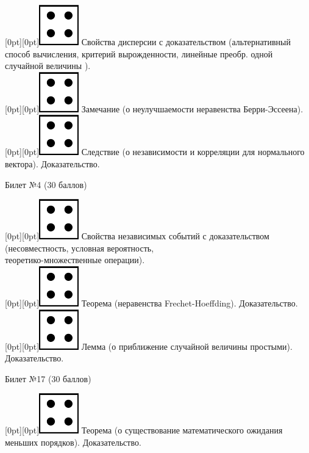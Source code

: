 \documentclass[10pt]{article}
\begin{document}
\raisebox{-1pt}[0pt][0pt]{\includegraphics[width=0.02\linewidth]{4.png}} Свойства дисперсии с доказательством (альтернативный способ вычисления, критерий вырожденности, линейные преобр. одной случайной величины ). \\ 

\raisebox{-1pt}[0pt][0pt]{\includegraphics[width=0.02\linewidth]{4.png}} Замечание (о неулучшаемости неравенства Берри-Эссеена). \\

\raisebox{-1pt}[0pt][0pt]{\includegraphics[width=0.02\linewidth]{4.png}} Следствие (о независимости и корреляции для нормального вектора). Доказательство. \\

\begin{center} {\Large Билет №4 (30 баллов)} \end{center}

\raisebox{-1pt}[0pt][0pt]{\includegraphics[width=0.02\linewidth]{4.png}} Свойства независимых событий с доказательством (несовместность, условная вероятность, \\ теоретико-множественные операции). \\

\raisebox{-1pt}[0pt][0pt]{\includegraphics[width=0.02\linewidth]{4.png}} Теорема (неравенства Frechet-Hoeffding). Доказательство. \\

\raisebox{-1pt}[0pt][0pt]{\includegraphics[width=0.02\linewidth]{4.png}} Лемма (о приближение случайной величины простыми). Доказательство. \\

\begin{center} {\Large Билет №17 (30 баллов)} \end{center}

\raisebox{-1pt}[0pt][0pt]{\includegraphics[width=0.02\linewidth]{4.png}} Теорема (о существование математического ожидания меньших порядков). Доказательство. \\
\end{document}
